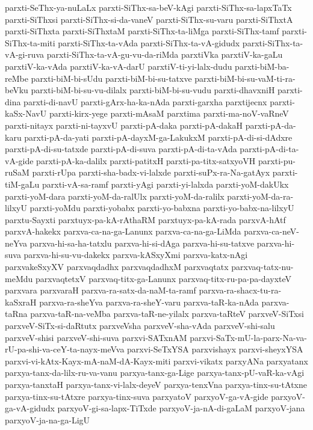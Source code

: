 {parxti-SeThx-ya-nuLaLx
parxti-SiThx-sa-beV-kAgi
parxti-SiThx-sa-lapxTaTx
parxti-SiThxsi
parxti-SiThx-si-da-vaneV
parxti-SiThx-su-varu
parxti-SiThxtA
parxti-SiThxta
parxti-SiThxtaM
parxti-SiThx-ta-liMga
parxti-SiThx-tamf
parxti-SiThx-ta-miti
parxti-SiThx-ta-vAda
parxti-SiThx-ta-vA-gidudx
parxti-SiThx-ta-vA-gi-ruva
parxti-SiThx-ta-vA-gu-vu-da-riMda
parxtiVka
parxtiV-ka-gaLu
parxtiV-ka-vAda
parxtiV-ka-vA-darU
parxtiV-ti-yi-lalx-dudu
parxti-biM-ba-reMbe
parxti-biM-bi-sUdu
parxti-biM-bi-su-tatxve
parxti-biM-bi-su-vaM-ti-ra-beVku
parxti-biM-bi-su-vu-dilalx
parxti-biM-bi-su-vudu
parxti-dhavxniH
parxti-dina
parxti-di-navU
parxti-gArx-ha-ka-nAda
parxti-garxha
parxtijecnx
parxti-kaSx-NavU
parxti-kirx-yege
parxti-mAsaM
parxtima
parxti-ma-noV-vaRneV
parxti-nitayx
parxti-ni-tayxvU
parxti-pA-daka
parxti-pA-dakaH
parxti-pA-da-karu
parxti-pA-da-yati
parxti-pA-dayxM-ga-LakukxM
parxti-pA-di-si-dAdxre
parxti-pA-di-su-tatxde
parxti-pA-di-suva
parxti-pA-di-ta-vAda
parxti-pA-di-ta-vA-gide
parxti-pA-ka-dalilx
parxti-patitxH
parxti-pa-titx-satxyoVH
parxti-pu-ruSaM
parxti-rUpa
parxti-sha-badx-vi-lalxde
parxti-suPx-ra-Na-gatAyx
parxti-tiM-gaLu
parxti-vA-sa-ramf
parxti-yAgi
parxti-yi-lalxda
parxti-yoM-dakUkx
parxti-yoM-dara
parxti-yoM-da-ralUlx
parxti-yoM-da-ralilx
parxti-yoM-da-ra-lilxyU
parxti-yoMdu
parxti-yobabx
parxti-yo-babxna
parxti-yo-babx-na-lilxyU
parxtu-Sayxti
parxtuyx-pa-kA-rAthaRM
parxtuyx-pa-kA-rada
parxvA-hAtf
parxvA-hakekx
parxva-ca-na-ga-Lanunx
parxva-ca-na-ga-LiMda
parxva-ca-neV-neYva
parxva-hi-sa-ha-tatxlu
parxva-hi-si-dAga
parxva-hi-su-tatxve
parxva-hi-suva
parxva-hi-su-vu-dakekx
parxva-kASxyXmi
parxva-katx-nAgi
parxvakeSxyXV
parxvaqdadhx
parxvaqdadhxM
parxvaqtatx
parxvaq-tatx-nu-meMdu
parxvaqtetxV
parxvaq-titx-ga-Lanunx
parxvaq-titx-ru-pa-pa-dayxteV
parxvara
parxvaraH
parxva-ra-satx-da-naM-ta-ramf
parxva-ra-shacx-tu-ra-kaSxraH
parxva-ra-sheYva
parxva-ra-sheY-varu
parxva-taR-ka-nAda
parxva-taRna
parxva-taR-na-veMba
parxva-taR-ne-yilalx
parxva-taRteV
parxveV-SiTxsi
parxveV-SiTx-si-daRtutx
parxveVsha
parxveV-sha-vAda
parxveV-shi-salu
parxveV-shisi
parxveV-shi-suva
parxvi-SATxnAM
parxvi-SaTx-mU-la-parx-Na-va-rU-pa-shi-va-ceY-ta-nayx-meVva
parxvi-SeTxYSA
parxvishayx
parxvi-sheyxYSA
parxvi-vi-kAtx-Kayx-mA-naM-dA-Kayx-miti
parxvi-vikatx
parxyANa
parxyatanx
parxya-tanx-da-lilx-ru-va-vanu
parxya-tanx-ga-Lige
parxya-tanx-pU-vaR-ka-vAgi
parxya-tanxtaH
parxya-tanx-vi-lalx-deyeV
parxya-tenxVna
parxya-tinx-su-tAtxne
parxya-tinx-su-tAtxre
parxya-tinx-suva
parxyatoV
parxyoV-ga-vA-gide
parxyoV-ga-vA-gidudx
parxyoV-gi-sa-lapx-TiTxde
parxyoV-ja-nA-di-gaLaM
parxyoV-jana
parxyoV-ja-na-ga-LigU
}
